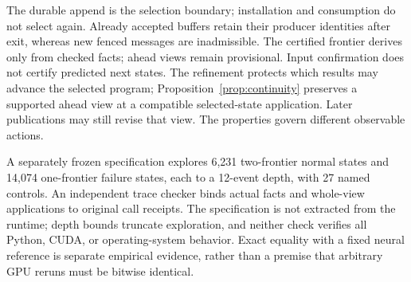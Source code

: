 The durable append is the selection boundary; installation and consumption
do not select again. Already accepted buffers retain their producer
identities after exit, whereas new fenced messages are inadmissible.
The certified frontier derives only from checked facts; ahead views remain
provisional. Input confirmation does not certify predicted next states.
The refinement protects which results may advance the selected program;
Proposition~\ref{prop:continuity} preserves a supported ahead view at a
compatible selected-state application. Later publications may still
revise that view. The properties govern different observable actions.

A separately frozen specification explores 6,231 two-frontier normal
states and 14,074 one-frontier failure states, each to a 12-event depth,
with 27 named controls. An independent trace checker binds actual facts
and whole-view applications to original call receipts. The specification
is not extracted from the runtime; depth bounds truncate exploration,
and neither check verifies all Python, CUDA, or operating-system behavior.
Exact equality with a fixed neural reference is separate empirical evidence,
rather than a premise that arbitrary GPU reruns must be bitwise identical.

